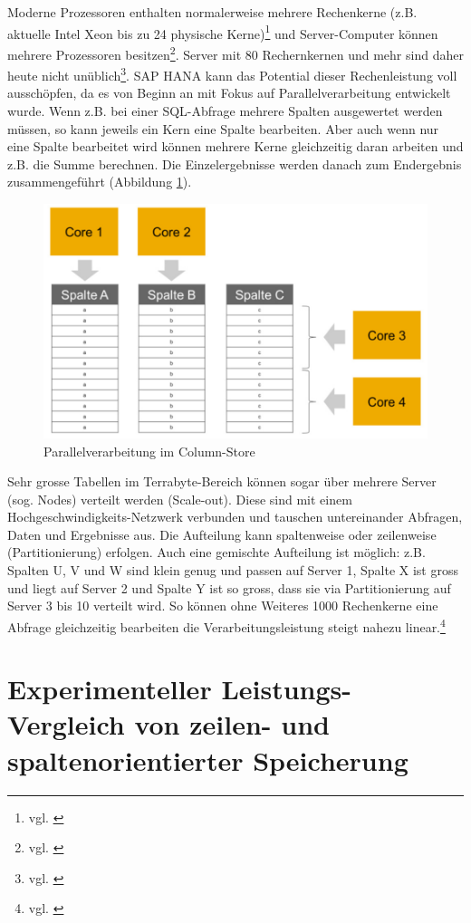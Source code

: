 Moderne Prozessoren enthalten normalerweise mehrere Rechenkerne 
(z.B. aktuelle Intel Xeon bis zu 24 physische Kerne)\footnote{vgl. \cite{Intel2016}}
und Server-Computer können mehrere Prozessoren besitzen\footnote{vgl. \cite{Intel2014}}.
Server mit 80 Rechernkernen und mehr sind daher heute nicht unüblich\footnote{vgl. \cite{Plattner2015hpi}}.
SAP HANA kann das Potential dieser Rechenleistung voll ausschöpfen, da es von
Beginn an mit Fokus auf Parallelverarbeitung entwickelt wurde.
Wenn z.B. bei einer SQL-Abfrage mehrere Spalten ausgewertet werden müssen, 
so kann jeweils ein Kern eine Spalte bearbeiten. Aber auch wenn nur eine Spalte bearbeitet wird
können mehrere Kerne gleichzeitig daran arbeiten und z.B. die Summe berechnen.
Die Einzelergebnisse werden danach zum Endergebnis zusammengeführt
(Abbildung \ref{paral}).
\begin{figure}[h]
\centering
\includegraphics[width=.7\textwidth]{img/parallelverarbeitung.png}
\caption[Parallelverarbeitung im Column-Store]{Parallelverarbeitung im Column-Store\footnotemark}
\label{paral}
\end{figure}
Sehr grosse Tabellen im Terrabyte-Bereich können sogar über mehrere Server
(sog. Nodes) verteilt werden (Scale-out). Diese sind mit einem Hochgeschwindigkeits-Netzwerk
verbunden und tauschen untereinander Abfragen, Daten und Ergebnisse aus.
Die Aufteilung kann spaltenweise oder zeilenweise (Partitionierung) erfolgen.
Auch eine gemischte Aufteilung ist möglich: z.B. Spalten U, V und W sind klein genug
und passen auf Server 1, Spalte X ist gross und liegt auf Server 2 und Spalte Y 
ist so gross, dass sie via Partitionierung auf Server 3 bis 10 verteilt wird.
So können ohne Weiteres 1000 Rechenkerne eine Abfrage gleichzeitig bearbeiten
die Verarbeitungsleistung steigt nahezu linear.\footnote{vgl. \cite{SAP2014}}

\section{Experimenteller Leistungs-Vergleich von zeilen- und spaltenorientierter Speicherung}
